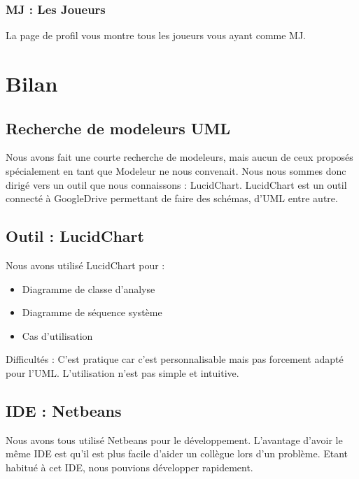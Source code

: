 \documentclass[a4paper,oneside,10pt]{article}
\begin{document}
\subsubsection{MJ : Les Joueurs}
\label{MUMJLesJoueurs}

La page de profil vous montre tous les joueurs vous ayant comme MJ.


\pagebreak

\section{Bilan}


\subsection{Recherche de modeleurs UML}

Nous avons fait une courte recherche de modeleurs, mais aucun de ceux proposés spécialement en tant que Modeleur ne nous convenait. Nous nous sommes donc dirigé vers un outil que nous connaissons : LucidChart. LucidChart est un outil connecté à GoogleDrive permettant de faire des schémas, d'UML entre autre. 


\subsection{Outil : LucidChart}

Nous avons utilisé LucidChart pour : 
\begin{itemize}
	\item Diagramme de classe d'analyse
	\item Diagramme de séquence système
	\item Cas d'utilisation
\end{itemize}

Difficultés : C'est pratique car c'est personnalisable mais pas forcement adapté pour l'UML. L'utilisation n'est pas simple et intuitive. 

\subsection{IDE : Netbeans}

Nous avons tous utilisé Netbeans pour le développement. L'avantage d'avoir le même IDE est qu'il est plus facile d'aider un collègue lors d'un problème. Etant habitué à cet IDE, nous pouvions développer rapidement. 
\end{document}
